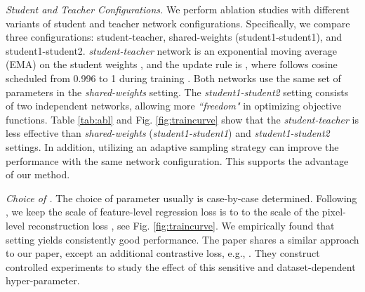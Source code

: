\documentclass[10pt,twocolumn,letterpaper]{article}
\begin{document}
\textcolor{nblue}{\textit{Student and Teacher Configurations.}}\label{subsec:modelsetting} We perform ablation studies with different variants of student and teacher network configurations. Specifically, we compare three configurations: student-teacher, shared-weights (student1-student1), and student1-student2. \textit{student-teacher} network is an exponential moving average (EMA) on the student weights \cite{moco}, and the update rule is , where  follows cosine scheduled from 0.996 to 1 during training \cite{byol,moco,dino}. Both networks use the same set of parameters in the \textit{shared-weights} setting. The \textit{student1-student2} setting consists of two independent networks, allowing more \textit{``freedom"} in optimizing objective functions. Table \ref{tab:abl} and Fig. \ref{fig:traincurve} show that the \textit{student-teacher} is less effective than \textit{shared-weights} (\textit{student1-student1}) and \textit{student1-student2} settings. In addition, utilizing an adaptive sampling strategy can improve the performance with the same network configuration. This supports the advantage of our method.

\textcolor{nblue}{\textit{Choice of .}} The choice of parameter  usually is case-by-case determined. Following \cite{morency,completer}, we keep the scale of feature-level regression loss  is  to  to the scale of the pixel-level reconstruction loss , see Fig. \ref{fig:traincurve}. We empirically found that setting  yields consistently good performance. The paper \cite{morency} shares a similar approach to our paper, except an additional contrastive loss, e.g., . They construct controlled experiments to study the effect of this sensitive and dataset-dependent hyper-parameter.
\end{document}
